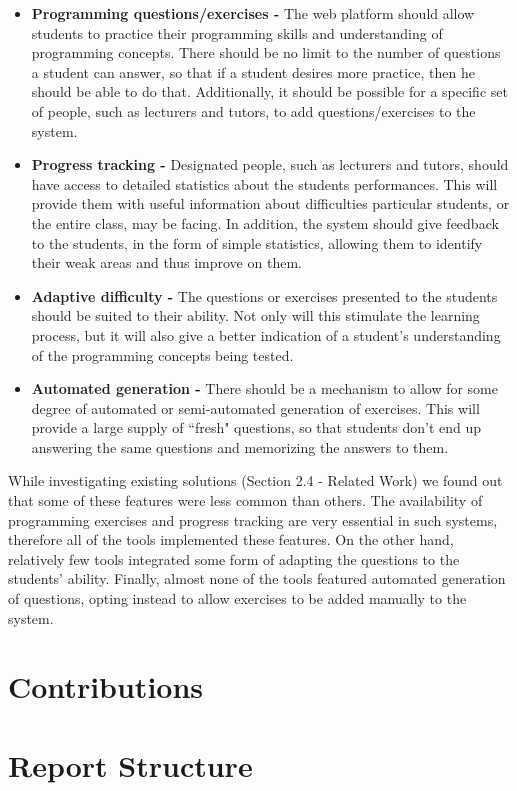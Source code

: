 \begin{itemize}
\item \textbf{Programming questions/exercises -} The web platform should allow students to practice their programming skills and understanding of programming concepts. There should be no limit to the number of questions a student can answer, so that if a student desires more practice, then he should be able to do that. Additionally, it should be possible for a specific set of people, such as lecturers and tutors, to add questions/exercises to the system.
\item \textbf{Progress tracking -} Designated people, such as lecturers and tutors, should have access to detailed statistics about the students performances. This will provide them with useful information about difficulties particular students, or the entire class, may be facing. In addition, the system should give feedback to the students, in the form of simple statistics, allowing them to identify their weak areas and thus improve on them.
\item \textbf{Adaptive difficulty -} The questions or exercises presented to the students should be suited to their ability. Not only will this stimulate the learning process, but it will also give a better indication of a student's understanding of the programming concepts being tested.
\item \textbf{Automated generation -} There should be a mechanism to allow for some degree of automated or semi-automated generation of exercises. This will provide a large supply of ``fresh" questions, so that students don't end up answering the same questions and memorizing the answers to them.
\end{itemize}

While investigating existing solutions (Section 2.4 - Related Work) we found out that some of these features were less common than others. The availability of programming exercises and progress tracking are very essential in such systems, therefore all of the tools implemented these features. On the other hand, relatively few tools integrated some form of adapting the questions to the students' ability. Finally, almost none of the tools featured automated generation of questions, opting instead to allow exercises to be added manually to the system.

\section{Contributions}

\section{Report Structure}
